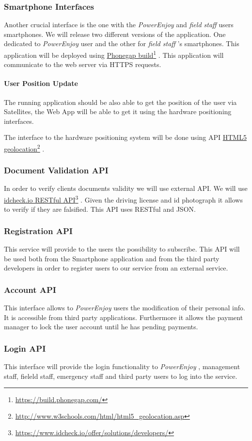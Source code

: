 \documentclass[english]{article}
\newcommand\fnurl[2]{%
	\href{#2}{#1}\footnote{\url{#2}}%
}
\newcommand{\powerenjoy}{\textit{PowerEnjoy }}
\newcommand{\fieldstaff}{\textit{field staff }}
\begin{document}
	\subsubsection*{Smartphone Interfaces}
	Another crucial interface is the one with the \powerenjoy and \fieldstaff users smartphones.
		We will release two different versions of the application. One dedicated to \powerenjoy user and the other for \fieldstaff's smartphones. This application will be deployed using \fnurl{Phonegap build}{https://build.phonegap.com/}. This application will communicate to the web server via HTTPS requests.
	\paragraph{User Position Update}
			The running application should be also able to get the position of the user via Satellites, the Web App will be able to get it using the hardware positioning interfaces.
		\par The interface to the hardware positioning system will be done using API \fnurl{HTML5 geolocation}{http://www.w3schools.com/html/html5_geolocation.asp}.
	\subsubsection*{Document Validation API}
		In order to verify clients documents validity we will use external API. We will use \fnurl{idcheck.io RESTful API}{https://www.idcheck.io/offer/solutions/developers/}. Given the driving license and id photograph it allows to verify if they are falsified. This API uses RESTful and JSON.
	\subsubsection*{Registration API}
		This service will provide to the users the possibility to subscribe. This API will be used both from the Smartphone application and from the third party developers in order to register users to our service from an external service.
	\subsubsection*{Account API}
		This interface allows to \powerenjoy users the modification of their personal info. It is accessible from third party applications. Furthermore it allows the payment manager to lock the user account until he has pending payments. 
	\subsubsection*{Login API}
		This interface will provide the login functionality to \powerenjoy, management staff, fieleld staff, emergency staff and third party users to log into the service.
\end{document}
